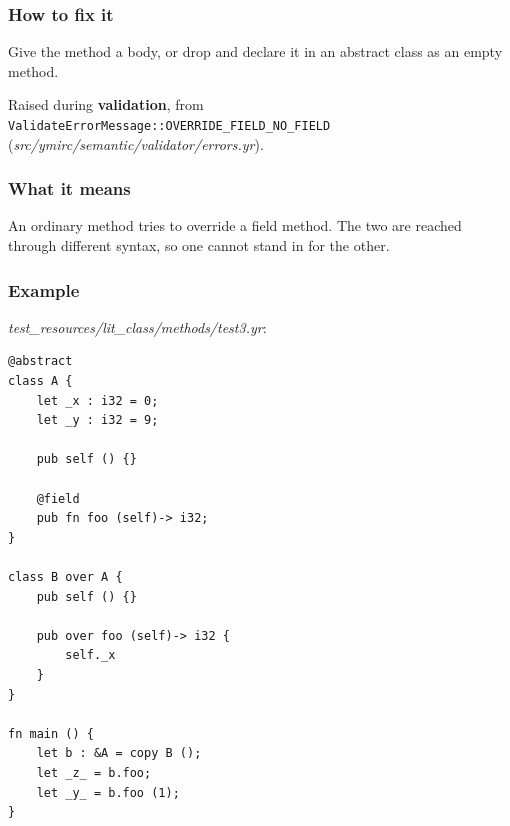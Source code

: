 \subsubsection*{How to fix it}

Give the method a body, or drop  and declare it in an abstract class as an empty method.

\label{sec:codes:e4182}

Raised during \textbf{validation}, from \texttt{ValidateErrorMessage::\allowbreak{}OVERRIDE\_\allowbreak{}FIELD\_\allowbreak{}NO\_\allowbreak{}FIELD} (\textit{src/\allowbreak{}ymirc/\allowbreak{}semantic/\allowbreak{}validator/\allowbreak{}errors.yr}).

\subsubsection*{What it means}

An ordinary method tries to override a field method. The two are reached through different syntax, so one cannot stand in for the other.

\subsubsection*{Example}

\textit{test\_\allowbreak{}resources/\allowbreak{}lit\_\allowbreak{}class/\allowbreak{}methods/\allowbreak{}test3.yr}:

\begin{lstlisting}[style=coloredverbatimError]
@abstract
class A {
    let _x : i32 = 0;
    let _y : i32 = 9;

    pub self () {}

    @field
    pub fn foo (self)-> i32;
}

class B over A {
    pub self () {}

    pub over foo (self)-> i32 {
        self._x
    }
}

fn main () {
    let b : &A = copy B ();
    let _z_ = b.foo;
    let _y_ = b.foo (1);
}
\end{lstlisting}

